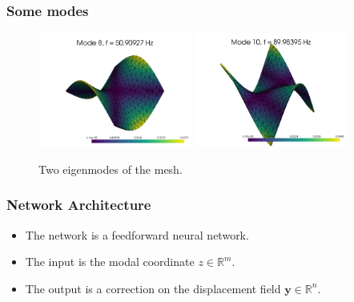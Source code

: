 \documentclass{beamer}
\begin{document}
\begin{frame}
    \frametitle{Some modes}

    \begin{figure}
        \centering
        \includegraphics[width=0.45\textwidth]{Images/mode_9.png}
        \includegraphics[width=0.45\textwidth]{Images/mode_10.png}
        \caption{Two eigenmodes of the mesh.}
        \label{fig:eigenmodes}
    \end{figure}
\end{frame}

\begin{frame}
    \frametitle{Network Architecture}
    \begin{itemize}
        \item The network is a feedforward neural network.
        \item The input is the modal coordinate \( z \in \mathbb{R}^m \).
        \item The output is a correction on the displacement field \( \mathbf{y} \in \mathbb{R}^n \).
    \end{itemize}



\begin{center}
        
\end{center}
    
\end{frame}
\end{document}
